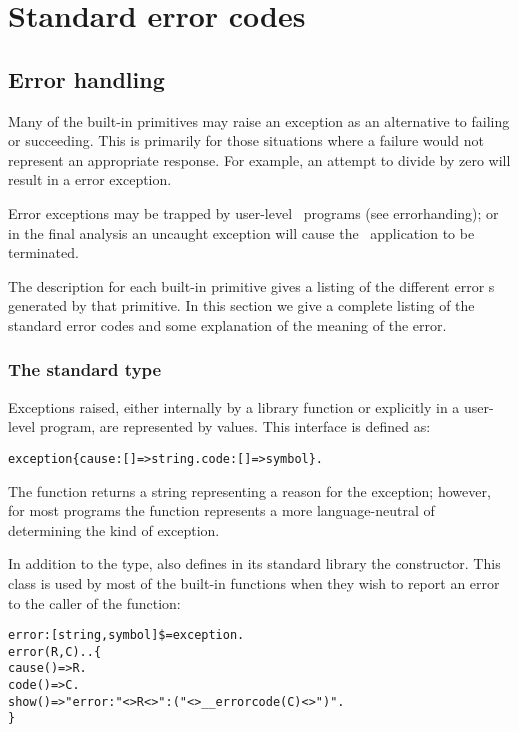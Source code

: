 \chapter{Standard error codes}
\label{errorcodes}
\section{Error handling}
  
Many of the built-in primitives may raise an exception as an alternative to failing or succeeding. This is primarily for those situations where a failure would not represent an appropriate response. For example, an attempt to divide by zero will result in a error exception.
  
Error exceptions may be trapped by user-level \go\ programs (see errorhanding); or in the final analysis an uncaught exception will cause the \go\ application to be terminated.

The description for each built-in primitive gives a listing of the different error s generated by that primitive. In this section we give a complete listing of the standard error codes and some explanation of the meaning of the error.

\subsection{The standard  type}
\label{error:exception}
Exceptions raised, either internally by a library function or explicitly in a user-level program, are represented by  values. This interface is defined as:
\begin{alltt}
exception \impl \{ cause:[]=>string. code:[]=>symbol \}.
\end{alltt}
\label{errortype}
The  function returns a string representing a reason for the exception; however, for most programs the  function represents a more language-neutral of determining the kind of exception.

In addition to the  type, \go also defines in its standard library the  constructor. This class is used by most of the built-in functions when they wish to report an error to the caller of the function:
\begin{alltt}
error:[string,symbol]\$=exception.
error(R,C)..\{
  cause()=>R.
  code()=>C.
  show()=>"error: "<>R<>": ("<>__errorcode(C)<>")".
\}
\end{alltt}
 
